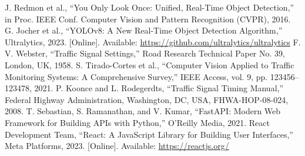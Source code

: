 \documentclass[conference]{IEEEtran}
\begin{document}
\begin{thebibliography}{00}
 J. Redmon et al., “You Only Look Once: Unified, Real-Time Object Detection,” in Proc. IEEE Conf. Computer Vision and Pattern Recognition (CVPR), 2016.
 G. Jocher et al., “YOLOv8: A New Real-Time Object Detection Algorithm,” Ultralytics, 2023. [Online]. Available: \url{https://github.com/ultralytics/ultralytics}
 F. V. Webster, “Traffic Signal Settings,” Road Research Technical Paper No. 39, London, UK, 1958.
 S. Tirado-Cortes et al., “Computer Vision Applied to Traffic Monitoring Systems: A Comprehensive Survey,” IEEE Access, vol. 9, pp. 123456–123478, 2021.
 P. Koonce and L. Rodegerdts, “Traffic Signal Timing Manual,” Federal Highway Administration, Washington, DC, USA, FHWA-HOP-08-024, 2008.
 T. Sebastian, S. Ramanathan, and V. Kumar, “FastAPI: Modern Web Framework for Building APIs with Python,” O’Reilly Media, 2021.
 React Development Team, “React: A JavaScript Library for Building User Interfaces,” Meta Platforms, 2023. [Online]. Available: \url{https://reactjs.org/}
\end{thebibliography}
\end{document}

